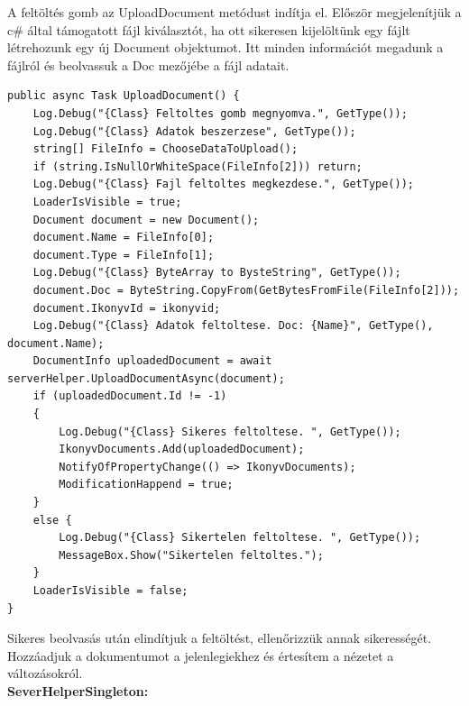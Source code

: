 \documentclass[
]{thesis-ekf}
\theoremstyle{definition}
\theoremstyle{remark}
\begin{document}
A feltöltés gomb az UploadDocument metódust indítja el. Először megjelenítjük a c\# által támogatott fájl kiválasztót, ha ott sikeresen kijelöltünk egy fájlt létrehozunk egy új Document objektumot. Itt minden információt megadunk a fájlról és beolvassuk a Doc mezőjébe a fájl adatait.
\begin{lstlisting}
public async Task UploadDocument() {
	Log.Debug("{Class} Feltoltes gomb megnyomva.", GetType());
	Log.Debug("{Class} Adatok beszerzese", GetType());
	string[] FileInfo = ChooseDataToUpload();
	if (string.IsNullOrWhiteSpace(FileInfo[2])) return;
	Log.Debug("{Class} Fajl feltoltes megkezdese.", GetType());
	LoaderIsVisible = true;
	Document document = new Document();
	document.Name = FileInfo[0];
	document.Type = FileInfo[1];
	Log.Debug("{Class} ByteArray to BysteString", GetType());
	document.Doc = ByteString.CopyFrom(GetBytesFromFile(FileInfo[2]));
	document.IkonyvId = ikonyvid;
	Log.Debug("{Class} Adatok feltoltese. Doc: {Name}", GetType(), document.Name);
	DocumentInfo uploadedDocument = await serverHelper.UploadDocumentAsync(document);
	if (uploadedDocument.Id != -1)
	{
		Log.Debug("{Class} Sikeres feltoltese. ", GetType());
		IkonyvDocuments.Add(uploadedDocument);
		NotifyOfPropertyChange(() => IkonyvDocuments);
		ModificationHappend = true;
	}
	else {
		Log.Debug("{Class} Sikertelen feltoltese. ", GetType());
		MessageBox.Show("Sikertelen feltoltes.");
	}
	LoaderIsVisible = false;
}
\end{lstlisting}
Sikeres beolvasás után elindítjuk a feltöltést, ellenőrizzük annak sikerességét. Hozzáadjuk a dokumentumot a jelenlegiekhez és értesítem a nézetet a változásokról.\\
\textbf{SeverHelperSingleton:}
\end{document}
